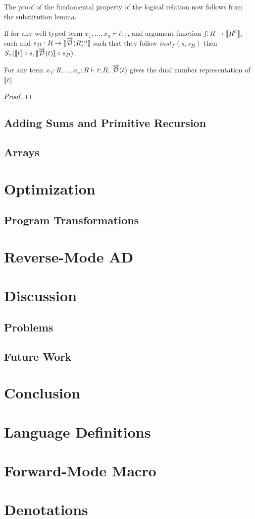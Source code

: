 \documentclass[11pt, final]{article}
\begin{document}
  The proof of the fundamental property of the logical relation now follows from the substitution lemma.



  \begin{theorem}
    If for any well-typed term $x_1, \dots, x_n \vdash t : \tau$, and argument function $f : R \rightarrow \llbracket R^n \rrbracket$, such and $s_D : R \rightarrow \llbracket \overrightarrow{\mathcal{D}}(R)^n \rrbracket$ such that they follow $inst_\Gamma(s, s_D)$ then $S_\tau(\llbracket t\rrbracket \circ s, \llbracket \overrightarrow{\mathcal{D}}(t)\rrbracket \circ s_D)$.
  \end{theorem}


  \begin{theorem}
    For any term $x_1 : R, ..., x_n : R \vdash t : R$, $\overrightarrow{\mathcal{D}}(t)$ gives the dual number representation of $\llbracket t \rrbracket$.
  \end{theorem}

  \begin{proof}

  \end{proof}



  \subsection{Adding Sums and Primitive Recursion}
  \subsection{Arrays}
\section{Optimization}
  \subsection{Program Transformations}
\section{Reverse-Mode AD}
\section{Discussion}
  \subsection{Problems}
  \subsection{Future Work}
\section{Conclusion}

\appendix
\section{Language Definitions}
\section{Forward-Mode Macro}
\section{Denotations}
\printbibliography
\makeatother
\end{document}
